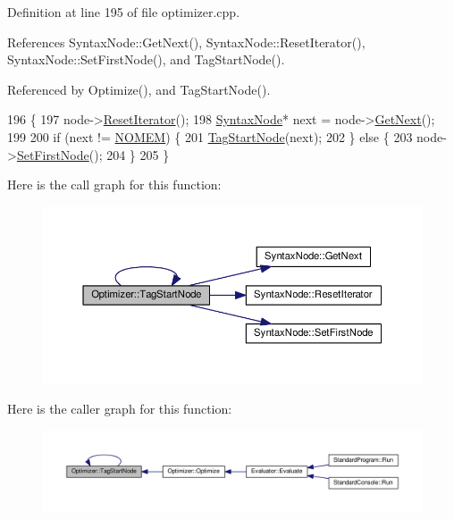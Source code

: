 Definition at line 195 of file optimizer.\+cpp.



References Syntax\+Node\+::\+Get\+Next(), Syntax\+Node\+::\+Reset\+Iterator(), Syntax\+Node\+::\+Set\+First\+Node(), and Tag\+Start\+Node().



Referenced by Optimize(), and Tag\+Start\+Node().


\begin{DoxyCode}
196 \{
197     node->\hyperlink{classSyntaxNode_ac51307368fb255aa760b99e137178c89}{ResetIterator}();
198     \hyperlink{classSyntaxNode}{SyntaxNode}* next = node->\hyperlink{classSyntaxNode_af1fa46ba30aa4f2affa2d4e96a4be010}{GetNext}();
199 
200     \textcolor{keywordflow}{if} (next != \hyperlink{platform_8h_a46ff2bfbf0d44b8466a2251d5bd5e6f8}{NOMEM}) \{
201         \hyperlink{classOptimizer_a2b71012237663dc9459a908fba6fbecc}{TagStartNode}(next);
202     \} \textcolor{keywordflow}{else} \{
203         node->\hyperlink{classSyntaxNode_a24e2d5b5e94a67ce55cea52cd48212e6}{SetFirstNode}();
204     \}
205 \}
\end{DoxyCode}


Here is the call graph for this function\+:
\nopagebreak
\begin{figure}[H]
\begin{center}
\leavevmode
\includegraphics[width=350pt]{d1/dc4/classOptimizer_a2b71012237663dc9459a908fba6fbecc_cgraph}
\end{center}
\end{figure}




Here is the caller graph for this function\+:
\nopagebreak
\begin{figure}[H]
\begin{center}
\leavevmode
\includegraphics[width=350pt]{d1/dc4/classOptimizer_a2b71012237663dc9459a908fba6fbecc_icgraph}
\end{center}
\end{figure}




